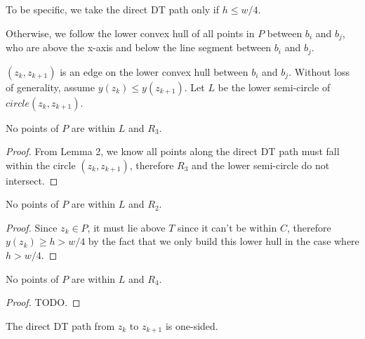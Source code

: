 \documentclass{tufte-handout}
\begin{document}
To be specific, we take the direct DT path only if $h \le w/4$.

Otherwise, we follow the lower convex hull of all points in $P$
between $b_i$ and $b_j$, who are above the x-axis and below the line
segment between $b_i$ and $b_j$.


$(z_k,z_{k+1})$ is an edge on the lower convex hull between $b_i$ and
$b_j$.  Without loss of generality, assume $y(z_k) \le y(z_{k+1})$.
Let $L$ be the lower semi-circle of $circle(z_k, z_{k+1})$.

\begin{Lemma}

  No points of $P$ are within $L$ and $R_3$.
  
\end{Lemma}

\begin{proof}
  
  From Lemma 2, we know all points along the direct DT path must fall
  within the circle $(z_k, z_{k+1})$, therefore $R_3$ and the lower
  semi-circle do not intersect.

\end{proof}

\begin{Lemma}

  No points of $P$ are within $L$ and $R_2$.
  
\end{Lemma}

\begin{proof}

  Since $z_k \in P$, it must lie above $T$ since it can't be within $C$,
  therefore $y(z_k) \ge h > w/4$ by the fact that we only build this
  lower hull in the case where $h > w/4$.

\end{proof}

\begin{Lemma}

  No points of $P$ are within $L$ and $R_4$.
  
\end{Lemma}

\begin{proof}

  TODO.

\end{proof}

\begin{Lemma}

  The direct DT path from $z_k$ to $z_{k+1}$ is one-sided.
  
\end{Lemma}
\end{document}
